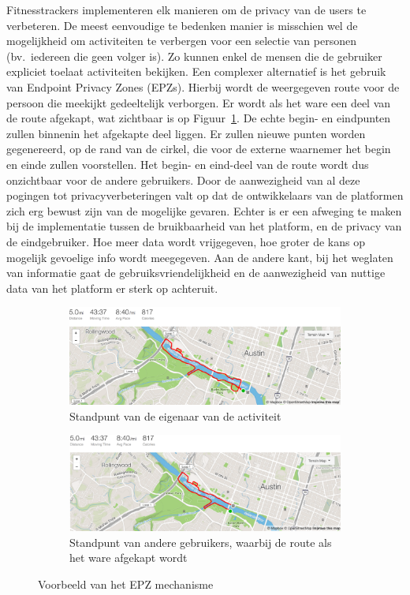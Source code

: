 Fitnesstrackers implementeren elk manieren om de privacy van de users te
verbeteren. De meest eenvoudige te bedenken manier is misschien wel de
mogelijkheid om activiteiten te verbergen voor een selectie van personen (bv.\
iedereen die geen volger is). Zo kunnen enkel de mensen die de gebruiker
expliciet toelaat activiteiten bekijken. Een complexer alternatief is het
gebruik van Endpoint Privacy Zones (\acp{EPZ}). Hierbij wordt de weergegeven
route voor de persoon die meekijkt gedeeltelijk verborgen. Er wordt als het
ware een deel van de route afgekapt, wat zichtbaar is op
Figuur~\ref{fig:example_hassan}. De echte begin- en eindpunten zullen binnenin
het afgekapte deel liggen. Er zullen nieuwe punten worden gegenereerd, op de
rand van de cirkel, die voor de externe waarnemer het begin en einde zullen
voorstellen. Het begin- en eind-deel van de route wordt dus onzichtbaar voor de
andere gebruikers. Door de aanwezigheid van al deze pogingen tot
privacyverbeteringen valt op dat de ontwikkelaars van de platformen zich erg
bewust zijn van de mogelijke gevaren. Echter is er een afweging te maken bij de
implementatie tussen de bruikbaarheid van het platform, en de privacy van de
eindgebruiker. Hoe meer data wordt vrijgegeven, hoe groter de kans op mogelijk
gevoelige info wordt meegegeven. Aan de andere kant, bij het weglaten van
informatie gaat de gebruiksvriendelijkheid en de aanwezigheid van nuttige data
van het platform er sterk op achteruit.
\begin{figure}[h]
    \centering
    \begin{subfigure}[b]{0.8\linewidth}
        \includegraphics[width=\linewidth]{fig/EPZ-mechanisme/Hassan_examle_before.png}
        \caption{Standpunt van de eigenaar van de activiteit}
    \end{subfigure}
    \begin{subfigure}[b]{0.8\linewidth}
        \includegraphics[width=\linewidth]{fig/EPZ-mechanisme/Hassan_examle_after.png}
        \caption{Standpunt van andere gebruikers, waarbij de route als het ware afgekapt wordt}
    \end{subfigure}
    \caption{Voorbeeld van het \ac{EPZ} mechanisme~\cite{sec18has3:online}}\label{fig:example_hassan}
\end{figure}

